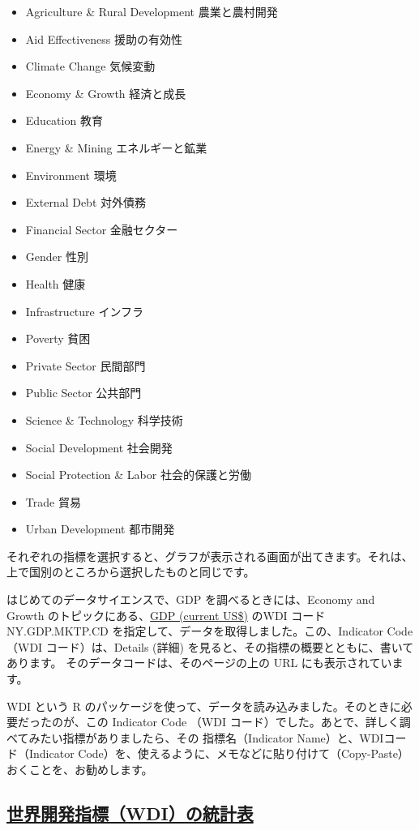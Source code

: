 \documentclass[
  xelatex, ja=standard]{bxjsbook}
\providecommand{\tightlist}{%
  \setlength{\itemsep}{0pt}\setlength{\parskip}{0pt}}
\theoremstyle{definition}
\theoremstyle{definition}
\theoremstyle{definition}
\theoremstyle{definition}
\theoremstyle{remark}
\begin{document}
\begin{itemize}
\tightlist
\item
  Agriculture \& Rural Development 農業と農村開発
\item
  Aid Effectiveness 援助の有効性
\item
  Climate Change 気候変動
\item
  Economy \& Growth 経済と成長
\item
  Education 教育
\item
  Energy \& Mining エネルギーと鉱業
\item
  Environment 環境
\item
  External Debt 対外債務
\item
  Financial Sector 金融セクター
\item
  Gender 性別
\item
  Health 健康
\item
  Infrastructure インフラ
\item
  Poverty 貧困
\item
  Private Sector 民間部門
\item
  Public Sector 公共部門
\item
  Science \& Technology 科学技術
\item
  Social Development 社会開発
\item
  Social Protection \& Labor 社会的保護と労働
\item
  Trade 貿易
\item
  Urban Development 都市開発
\end{itemize}

それぞれの指標を選択すると、グラフが表示される画面が出てきます。それは、上で国別のところから選択したものと同じです。

はじめてのデータサイエンスで、GDP を調べるときには、Economy and Growth のトピックにある、\href{https://data.worldbank.org/indicator/NY.GDP.MKTP.CD?view=chart}{GDP (current US\$)} のWDI コード NY.GDP.MKTP.CD を指定して、データを取得しました。この、Indicator Code （WDI コード）は、Details (詳細) を見ると、その指標の概要とともに、書いてあります。 そのデータコードは、そのページの上の URL にも表示されています。

WDI という R のパッケージを使って、データを読み込みました。そのときに必要だったのが、この Indicator Code （WDI コード）でした。あとで、詳しく調べてみたい指標がありましたら、その 指標名（Indicator Name）と、WDIコード（Indicator Code）を、使えるように、メモなどに貼り付けて（Copy-Paste）おくことを、お勧めします。

\hypertarget{ux4e16ux754cux958bux767aux6307ux6a19wdiux306eux7d71ux8a08ux8868}{%
\subsection{\texorpdfstring{\href{http://wdi.worldbank.org/tables}{世界開発指標（WDI）の統計表}}{世界開発指標（WDI）の統計表}}\label{ux4e16ux754cux958bux767aux6307ux6a19wdiux306eux7d71ux8a08ux8868}}
\end{document}
